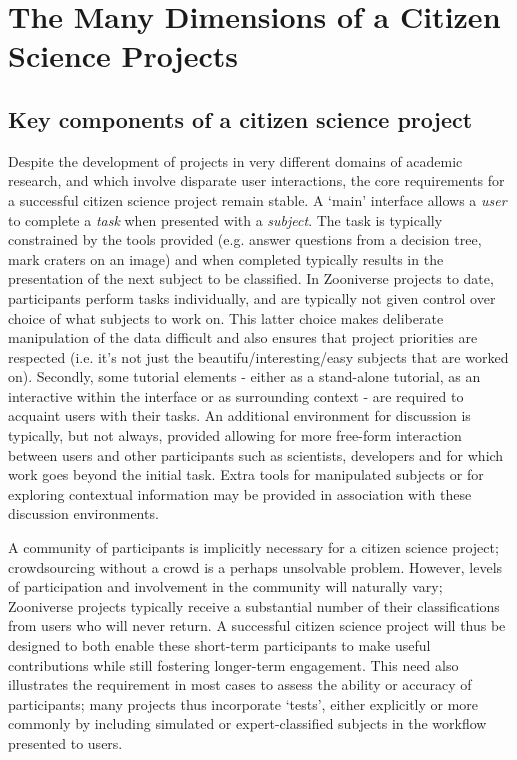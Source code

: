 \documentclass{sigchi}
\begin{document}

\section{The Many Dimensions of a Citizen Science Projects} %

\subsection{Key components of a citizen science project}

Despite the development of projects in very different domains of academic research, and which involve disparate user interactions, the core requirements for a successful citizen science project remain stable. A `main' interface allows a \emph{user} to complete a \emph{task} when presented with a \emph{subject}. The task is typically constrained by the tools provided (e.g. answer questions from a decision tree, mark craters on an image) and when completed typically results in the presentation of the next subject to be classified. In Zooniverse projects to date, participants perform tasks individually, and are typically not given control over choice of what subjects to work on. This latter choice makes deliberate manipulation of the data difficult and also ensures that project priorities are respected (i.e. it's not just the beautifu/interesting/easy subjects that are worked on). Secondly, some tutorial elements - either as a stand-alone tutorial, as an interactive within the interface or as surrounding context - are required to acquaint users with their tasks. An additional environment for discussion is typically, but not always, provided allowing for more free-form interaction between users and other participants such as scientists, developers and for which work goes beyond the initial task. Extra tools for manipulated subjects or for exploring contextual information may be provided in association with these discussion environments. 

A community of participants is implicitly necessary for a citizen science project; crowdsourcing without a crowd is a perhaps unsolvable problem. However, levels of participation and involvement in the community will naturally vary; Zooniverse projects typically receive a substantial number of their classifications from users who will never return. A successful citizen science project will thus be designed to both enable these short-term participants to make useful contributions while still fostering longer-term engagement. This need also illustrates the requirement in most cases to assess the ability or accuracy of participants; many projects thus incorporate `tests', either explicitly or more commonly by including simulated or expert-classified subjects in the workflow presented to users. 
\end{document}

